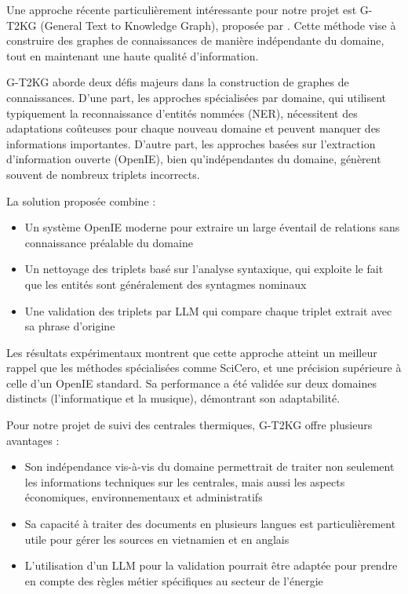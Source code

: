 \documentclass[a4paper,11pt]{report}
\providecommand{\tightlist}{\setlength{\itemsep}{0pt}\setlength{\parskip}{0pt}}
\begin{document}
Une approche récente particulièrement intéressante pour notre projet est G-T2KG (General Text to Knowledge Graph), proposée par \citep{A8YXRKGQ}. Cette méthode vise à construire des graphes de connaissances de manière indépendante du domaine, tout en maintenant une haute qualité d'information.

G-T2KG aborde deux défis majeurs dans la construction de graphes de connaissances. D'une part, les approches spécialisées par domaine, qui utilisent typiquement la reconnaissance d'entités nommées (NER), nécessitent des adaptations coûteuses pour chaque nouveau domaine et peuvent manquer des informations importantes. D'autre part, les approches basées sur l'extraction d'information ouverte (OpenIE), bien qu'indépendantes du domaine, génèrent souvent de nombreux triplets incorrects.

La solution proposée combine :

\begin{itemize}
\tightlist
\item
  Un système OpenIE moderne pour extraire un large éventail de relations sans connaissance préalable du domaine
\item
  Un nettoyage des triplets basé sur l'analyse syntaxique, qui exploite le fait que les entités sont généralement des syntagmes nominaux
\item
  Une validation des triplets par LLM qui compare chaque triplet extrait avec sa phrase d'origine
\end{itemize}

Les résultats expérimentaux montrent que cette approche atteint un meilleur rappel que les méthodes spécialisées comme SciCero, et une précision supérieure à celle d'un OpenIE standard. Sa performance a été validée sur deux domaines distincts (l'informatique et la musique), démontrant son adaptabilité.

Pour notre projet de suivi des centrales thermiques, G-T2KG offre plusieurs avantages :

\begin{itemize}
\tightlist
\item
  Son indépendance vis-à-vis du domaine permettrait de traiter non seulement les informations techniques sur les centrales, mais aussi les aspects économiques, environnementaux et administratifs
\item
  Sa capacité à traiter des documents en plusieurs langues est particulièrement utile pour gérer les sources en vietnamien et en anglais
\item
  L'utilisation d'un LLM pour la validation pourrait être adaptée pour prendre en compte des règles métier spécifiques au secteur de l'énergie
\end{itemize}
\end{document}
